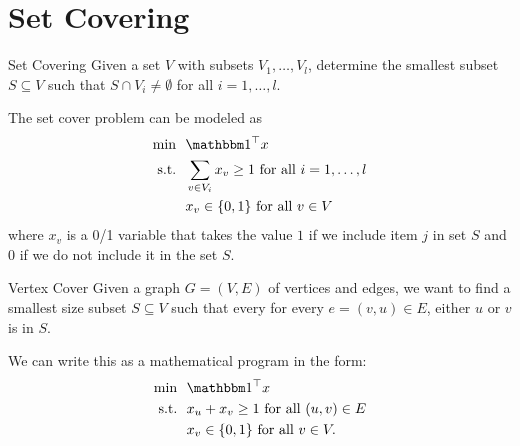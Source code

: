 \documentclass[../open-optimization/open-optimization.tex]{subfiles}
\begin{document}
\section{Set Covering}
\begin{general}{Set Covering}{\npcomplete}
\label{general:set-covering}
Given a set $V$ with subsets $V_1, \dots, V_l$, determine the smallest subset $S \subseteq V$ such that 
$S \cap V_i \neq \emptyset$ for all $i=1, \dots, l$.

The set cover problem can be modeled as
\begin{equation}
\begin{split}
\min \ \ & \one^\top x\\
\text{s.t.} \ \ & \sum_{v \in V_i} x_v \geq 1 \text{ for all } i =1, \dots, l \\ 
& x_v \in \{0,1\} \text{ for all } v \in V
\end{split}
\end{equation}
where $x_v$ is a 0/1 variable that takes the value $1$ if we include item $j$ in set $S$ and $0$ if we do not include it in the set $S$.  
\end{general}
\begin{general}{Vertex Cover}{\npcomplete}
Given a graph $G = (V,E)$ of vertices and edges, we want to find a smallest size subset $S \subseteq V$ such that every for every $e = (v,u) \in E$, either $u$ or $v$ is in $S$.   

We can write this as a mathematical program in the form:
\begin{equation}
\begin{split}
\min \ \ & \one^\top x\\
\text{s.t.} \ \ & x_u + x_v \geq 1 \text{ for all } (u,v) \in E \\ 
& x_v \in \{0,1\} \text{ for all } v \in V.
\end{split}
\end{equation}
\end{general}
\end{document}
